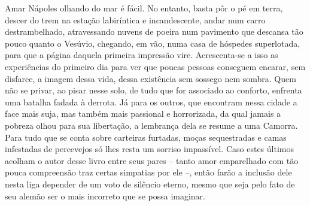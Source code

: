 
Amar Nápoles olhando do mar é fácil. No entanto, basta pôr o pé em
terra, descer do trem na estação labiríntica e incandescente, andar num
carro destrambelhado, atravessando nuvens de poeira num pavimento que
descansa tão pouco quanto o Vesúvio, chegando, em vão, numa casa de
hóspedes superlotada, para que a página daquela primeira impressão vire.
Acrescenta-se a isso as experiências do primeiro dia para ver que poucas
pessoas conseguem encarar, sem disfarce, a imagem dessa vida, dessa
existência sem sossego nem sombra. Quem não se privar, ao pisar nesse
solo, de tudo que for associado ao conforto, enfrenta uma batalha fadada
à derrota. Já para os outros, que encontram nessa cidade a face mais
suja, mas também mais passional e horrorizada, da qual jamais a pobreza
olhou para sua libertação, a lembrança dela se resume a uma Camorra.
Para tudo que se conta sobre carteiras furtadas, moças sequestradas e
camas infestadas de percevejos só lhes resta um sorriso impassível. Caso
estes últimos acolham o autor desse livro entre seus pares -- tanto amor
emparelhado com tão pouca compreensão traz certas simpatias por ele --,
então farão a inclusão dele nesta liga depender de um voto de silêncio
eterno, mesmo que seja pelo fato de seu alemão ser o mais incorreto que
se possa imaginar.

